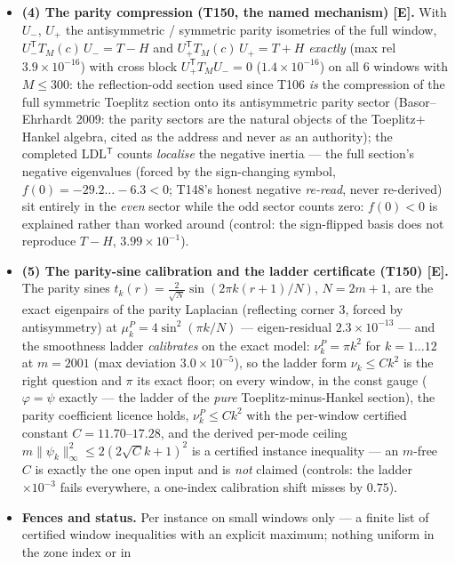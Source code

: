 \documentclass[11pt]{article}
\providecommand{\mE}{\textbf{[E]}}\providecommand{\mC}{\textbf{[C]}}
\begin{document}
\begin{itemize}[leftmargin=1.5em]
dropping the positive part in the zone formula breaks the identity at $4.25\times10^{-1}$).
\item \textbf{(4) The parity compression (T150, the named mechanism) \mE.} With $U_-$, $U_+$
the antisymmetric / symmetric parity isometries of the full window,
$U_-^{\mathsf T}T_M(c)\,U_-=T-H$ and $U_+^{\mathsf T}T_M(c)\,U_+=T+H$ \emph{exactly} (max rel
$3.9\times10^{-16}$) with cross block $U_+^{\mathsf T}T_MU_-=0$ ($1.4\times10^{-16}$) on all
$6$ windows with $M\le300$: the reflection-odd section used since T106 \emph{is} the
compression of the full symmetric Toeplitz section onto its antisymmetric parity sector
(Basor--Ehrhardt 2009: the parity sectors are the natural objects of the Toeplitz$+$Hankel
algebra, cited as the address and never as an authority); the completed LDL$^{\mathsf T}$
counts \emph{localise} the negative inertia --- the full section's negative eigenvalues
(forced by the sign-changing symbol, $f(0)=-29.2\ldots-6.3<0$; T148's honest negative
\emph{re-read}, never re-derived) sit entirely in the \emph{even} sector while the odd sector
counts zero: $f(0)<0$ is explained rather than worked around (control: the sign-flipped basis
does not reproduce $T-H$, $3.99\times10^{-1}$).
\item \textbf{(5) The parity-sine calibration and the ladder certificate (T150) \mE.} The
parity sines $t_k(r)=\tfrac{2}{\sqrt N}\sin(2\pi k(r{+}1)/N)$, $N=2m{+}1$, are the exact
eigenpairs of the parity Laplacian (reflecting corner $3$, forced by antisymmetry) at
$\mu^P_k=4\sin^2(\pi k/N)$ --- eigen-residual $2.3\times10^{-13}$ --- and the smoothness ladder
\emph{calibrates} on the exact model: $\nu^P_k=\pi k^2$ for $k=1\ldots12$ at $m=2001$ (max
deviation $3.0\times10^{-5}$), so the ladder form $\nu_k\le Ck^2$ is the right question and
$\pi$ its exact floor; on every window, in the const gauge ($\varphi=\psi$ exactly --- the
ladder of the \emph{pure} Toeplitz-minus-Hankel section), the parity coefficient licence holds,
$\nu^P_k\le Ck^2$ with the per-window certified constant $C=11.70$--$17.28$, and the derived
per-mode ceiling $m\|\psi_k\|_\infty^2\le2(2\sqrt Ck+1)^2$ is a certified instance inequality
--- an $m$-free $C$ is exactly the one open input and is \emph{not} claimed (controls: the
ladder $\times10^{-3}$ fails everywhere, a one-index calibration shift misses by $0.75$).
\item \textbf{Fences and status.} Per instance on small windows only --- a finite list of
certified window inequalities with an explicit maximum; nothing uniform in the zone index or in

\end{itemize}
\end{document}
